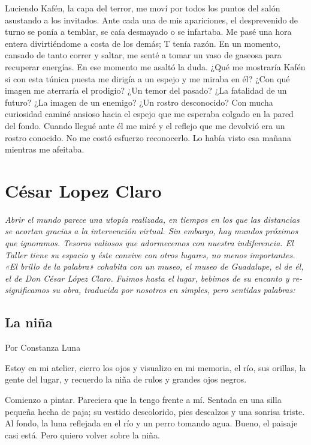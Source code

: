 \documentclass[11pt,twoside,openright,a5paper]{book}
\begin{document}
Luciendo Kafén, la capa del terror, me moví por todos los puntos del salón asustando a los invitados. Ante cada una de mis apariciones, el desprevenido de turno se ponía a temblar, se caía desmayado o se infartaba. Me pasé una hora entera divirtiéndome a costa de los demás; T tenía razón. En un momento, cansado de tanto correr y saltar, me senté a tomar un vaso de gaseosa para recuperar energías. En ese momento me asaltó la duda. ¿Qué me mostraría Kafén si con esta túnica puesta me dirigía a un espejo y me miraba en él? ¿Con qué imagen me aterraría el prodigio? ¿Un temor del pasado? ¿La fatalidad de un futuro? ¿La imagen de un enemigo? ¿Un rostro desconocido? Con mucha curiosidad caminé ansioso hacia el espejo que me esperaba colgado en la pared del fondo. Cuando llegué ante él me miré y el reflejo que me devolvió era un rostro conocido. No me costó esfuerzo reconocerlo. Lo había visto esa mañana mientras me afeitaba.

\chapter*{César Lopez Claro}
\vspace{0.5cm}
\emph{Abrir el mundo parece una utopía realizada, en tiempos en los que las distancias se acortan gracias a la intervención virtual.
Sin embargo, hay mundos próximos que ignoramos. Tesoros valiosos que adormecemos con nuestra indiferencia.
El Taller tiene su espacio y éste convive con otros lugares, no menos importantes.
«El brillo de la palabra» cohabita con un museo, el museo de Guadalupe, el de él, el de Don César López Claro. 
Fuimos hasta el lugar, bebimos de su encanto y re-significamos su obra, traducida por nosotros en simples, pero sentidas palabras:}

\section*{La niña}

                                                                                                     \begin{flushright}Por Constanza Luna\end{flushright}

Estoy en mi atelier, cierro los ojos y visualizo en mi memoria, el río, sus orillas, la gente del lugar, y recuerdo la niña de rulos y grandes ojos negros.

Comienzo a pintar. Pareciera que la tengo frente a mí. Sentada en una silla pequeña hecha de paja; su vestido descolorido, pies descalzos y una sonrisa triste. Al fondo, la luna reflejada en el río y un perro tomando agua. Bueno, el paisaje casi está. Pero quiero volver sobre la niña.
\end{document}
